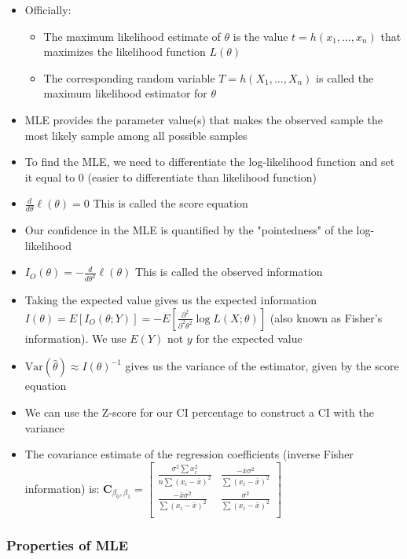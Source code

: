 \documentclass{article}
\begin{document}
\begin{itemize}
    \item Officially:
    \begin{itemize}
        \item The maximum likelihood estimate of $\theta$ is the value $t=h(x_1,\dots,x_n)$ that maximizes the likelihood function $L(\theta)$
        \item The corresponding random variable $T=h(X_1,\dots,X_n)$ is called the maximum likelihood estimator for $\theta$
    \end{itemize}
    \item MLE provides the parameter value(s) that makes the observed sample the most likely sample among all possible samples
    \item To find the MLE, we need to differentiate the log-likelihood function and set it equal to 0 (easier to differentiate than likelihood function)
    \item $\frac{d}{d\theta} \ell (\theta)=0$ This is called the score equation
    \item Our confidence in the MLE is quantified by the "pointedness" of the log-likelihood
    \item $I_O(\theta)=-\frac{d}{d\theta^2} \ell (\theta)$ This is called the observed information
    \item Taking the expected value gives us the expected information $I(\theta)=E[I_O(\theta;Y)]=-E[\frac{\partial^2}{\partial^2 \theta^2} \log L(X;\theta)]$ (also known as Fisher's information). We use $E(Y)$ not $y$ for the expected value
    \item $\text{Var}(\hat{\theta}) \approx I(\theta)^{-1}$ gives us the variance of the estimator, given by the score equation
    \item We can use the Z-score for our CI percentage to construct a CI with the variance
    \item The covariance estimate of the regression coefficients (inverse Fisher information) is: $\mathbf{C}_{\beta_0,\beta_1}=\begin{bmatrix}
\frac{\sigma^2 \sum x_i^2}{n \sum(x_i-\bar{x})^2} & \frac{-\bar{x}\sigma^2}{\sum(x_i-\bar{x})^2} \\
\frac{-\bar{x}\sigma^2}{\sum(x_i-\bar{x})^2} & \frac{\sigma^2}{\sum(x_i-\bar{x})^2} \\
\end{bmatrix}$
\end{itemize}

\subsubsection{Properties of MLE}
\end{document}
